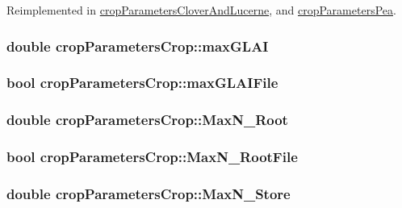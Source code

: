 Reimplemented in \hyperlink{classcrop_parameters_clover_and_lucerne_a39a5d4684180915dd9e63fd19680dc74}{cropParametersCloverAndLucerne}, and \hyperlink{classcrop_parameters_pea_a3da0138ad9c2d5717bce0a420e52c39a}{cropParametersPea}.\hypertarget{classcrop_parameters_crop_a0bc009a6c4c94105f1ff436a0035abb5}{
\subsubsection[{maxGLAI}]{\setlength{\rightskip}{0pt plus 5cm}double {\bf cropParametersCrop::maxGLAI}}}
\label{classcrop_parameters_crop_a0bc009a6c4c94105f1ff436a0035abb5}
\hypertarget{classcrop_parameters_crop_a264ca877ed32701c02dc206ca5b0c9a5}{
\subsubsection[{maxGLAIFile}]{\setlength{\rightskip}{0pt plus 5cm}bool {\bf cropParametersCrop::maxGLAIFile}}}
\label{classcrop_parameters_crop_a264ca877ed32701c02dc206ca5b0c9a5}
\hypertarget{classcrop_parameters_crop_a4defb6b2c990aa913d519b06be16fb6f}{
\subsubsection[{MaxN\_\-Root}]{\setlength{\rightskip}{0pt plus 5cm}double {\bf cropParametersCrop::MaxN\_\-Root}}}
\label{classcrop_parameters_crop_a4defb6b2c990aa913d519b06be16fb6f}
\hypertarget{classcrop_parameters_crop_a0429ac721f4ed8f1870ba337c85f4e45}{
\subsubsection[{MaxN\_\-RootFile}]{\setlength{\rightskip}{0pt plus 5cm}bool {\bf cropParametersCrop::MaxN\_\-RootFile}}}
\label{classcrop_parameters_crop_a0429ac721f4ed8f1870ba337c85f4e45}
\hypertarget{classcrop_parameters_crop_ac582cb5a383dc857aafbaaa7ad26d565}{
\subsubsection[{MaxN\_\-Store}]{\setlength{\rightskip}{0pt plus 5cm}double {\bf cropParametersCrop::MaxN\_\-Store}}}
